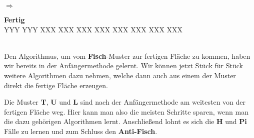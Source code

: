 $\Longrightarrow$
\parbox{0.2\linewidth}{
\begin{center}
  \textbf{Fertig} \\[1ex]
  \RubikCubeGreyAll%
	      {Y}{Y}{Y}
	      {Y}{Y}{Y}%
		 {X}{X}{X}
		 {X}{X}{X}%
		 {X}{X}{X}
		 {X}{X}{X}%
		{X}{X}{X}
		{X}{X}{X}%
		{X}{X}{X}
		{X}{X}{X}%
\end{center}
}\\[2em]

Den Algorithmus, um vom \textbf{Fisch}-Muster zur fertigen Fläche zu kommen, haben wir bereits in der Anfängermethode gelernt.
Wir können jetzt Stück für Stück weitere Algorithmen dazu nehmen, welche dann auch aus einem der Muster direkt die fertige Fläche erzeugen.

Die Muster \textbf{T}, \textbf{U} und \textbf{L} sind nach der Anfängermethode am weitesten von der fertigen Fläche weg.
Hier kann man also die meisten Schritte sparen, wenn man die dazu gehörigen Algorithmen lernt.
Anschließend lohnt es sich die \textbf{H} und \textbf{Pi} Fälle zu lernen und zum Schluss den \textbf{Anti-Fisch}.
